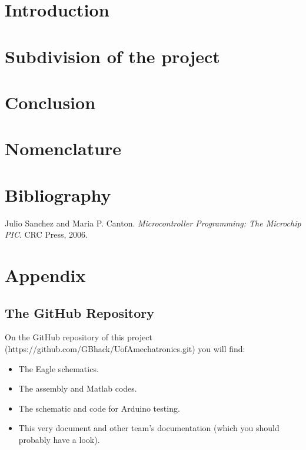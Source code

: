 \documentclass[12pt]{article}
\begin{document}


\newpage
\tableofcontents
\newpage

\section{Introduction}

	
\newpage
\section{Subdivision of the project}

	

	\begin{center}
	
	\end{center}
	
	 \cite{EEPROM}


	

\newpage
\section{Conclusion}
	


\newpage
\section{Nomenclature}
	\printnomenclature

\newpage
\section{Bibliography}

	\begin{thebibliography}{9}
	Julio Sanchez and Maria P. Canton.
	\textit{Microcontroller Programming: The Microchip PIC}. 
	CRC Press, 2006.
	\end{thebibliography}

\newpage
\section{Appendix}

	\subsection{The GitHub Repository}

		On the GitHub repository of this project (https://github.com/GBhack/UofAmechatronics.git) you will find:
		\begin{itemize}
			\item The Eagle schematics.
			\item The assembly and Matlab codes.
			\item The schematic and code for Arduino testing.
			\item This very document and other team's documentation (which you should probably have a look).
		\end{itemize}
\end{document}
